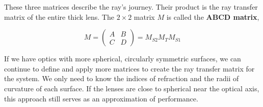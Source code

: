 \documentclass[
  letterpaper,
]{book}
\begin{document}
These three matrices describe the ray's journey. Their product is the
ray transfer matrix of the entire thick lens. The \(2 \times 2\) matrix
\(M\) is called the \textbf{ABCD matrix},

\[
M =
\begin{pmatrix}
A & B \\
C & D
\end{pmatrix} = M_{S2} M_{T} M_{S1}
\]

If we have optics with more spherical, circularly symmetric surfaces, we
can continue to define and apply more matrices to create the ray
transfer matrix for the system. We only need to know the indices of
refraction and the radii of curvature of each surface. If the lenses are
close to spherical near the optical axis, this approach still serves as
an approximation of performance.
\end{document}

